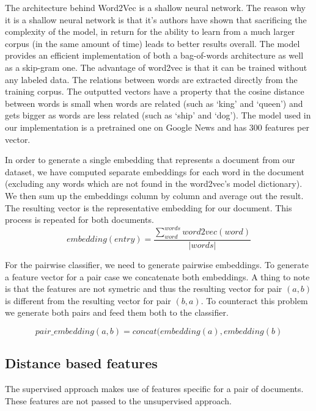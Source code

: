 The architecture behind Word2Vec is a shallow neural network.
The reason why it is a shallow neural network is that it’s authors have
shown that sacrificing the complexity of the model, in return for the ability
to learn from a much larger corpus (in the same amount of time) leads to
better results overall. The model provides an efficient implementation of
both a bag-of-words architecture as well as a skip-gram one. The advantage of
word2vec is that it can be trained without any labeled data. The relations
between words are extracted directly from the training corpus. The outputted
vectors have a property that the cosine distance between words is small when
words are related (such as ‘king’ and ‘queen’) and gets bigger as words are
less related (such as ‘ship’ and ‘dog’). The model used in our implementation
is a pretrained one on Google News and has 300 features per vector.

In order to generate a single embedding that represents a document from our dataset,
we have computed separate embeddings for each word in the document (excluding any
words which are not found in the word2vec's model dictionary). We then sum up
the embeddings column by column and average out the result. The resulting vector
is the representative embedding for our document. This process is repeated for
both documents.
\[
  embedding(entry) = \frac{\sum_{word}^{words} word2vec(word)}{|words|}
\]

For the pairwise classifier, we need to generate pairwise embeddings. To generate
a feature vector for a pair case we concatenate both embeddings. A
thing to note is that the features are not symetric and thus the resulting vector
for pair $ (a, b) $ is different from the resulting vector for pair $ (b, a) $.
To counteract this problem we generate both pairs and feed them both to the classifier.

\[
  pair\_embedding(a, b) = concat(embedding(a), embedding(b)
\]

\subsection{Distance based features}
\label{sub-sec:distance-based-features}

The supervised approach makes use of features specific for a pair of documents.
These features are not passed to the unsupervised approach.

